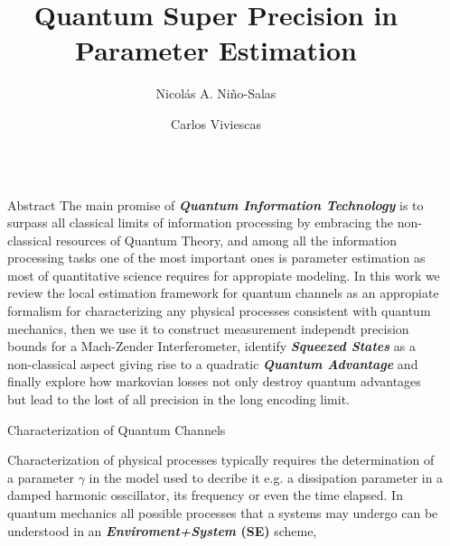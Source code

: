 \documentclass[final]{beamer}
\title{Quantum  Super Precision in Parameter Estimation}
\author{Nicolás A. Niño-Salas \inst{1} \and Carlos Viviescas  \inst{2} }
\institute[shortinst]{Universidad Nacional de Colombia, Sede Bogotá }
\newlength{\sepwidth}
\newlength{\colwidth}
\newcommand{\separatorcolumn}{\begin{column}{\sepwidth}\end{column}}
\begin{document}
\begin{frame}[t]
\begin{columns}[t]
\separatorcolumn

\begin{column}{\colwidth}

  \begin{block}{Abstract}
    The main promise of \textit{\textbf{Quantum Information Technology}} is to surpass all classical limits of information
    processing by embracing the non-classical resources of Quantum
    Theory, and among all the information processing tasks one of the
    most important ones is parameter estimation as most of
    quantitative science requires for appropiate modeling. In this
    work we review the local estimation framework for quantum
    channels  as an appropiate formalism
    for characterizing any physical processes consistent with
    quantum mechanics, then we use it to construct measurement
    independt precision bounds for a Mach-Zender Interferometer,
    identify \textit{\textbf{Squeezed States}} as a non-classical
    aspect giving rise to a quadratic \textit{\textbf{Quantum Advantage}} and finally explore how markovian losses not only
    destroy quantum advantages but lead to the lost of all precision
    in the long encoding limit.
  \end{block}

  \begin{block}{Characterization of Quantum Channels}
  \end{block}
  Characterization of physical processes typically requires the determination of a parameter $\gamma$ in the model used to decribe it e.g.
  a dissipation parameter in a damped harmonic osscillator, its frequency or even the time elapsed. In quantum mechanics
  all possible processes that a systems may undergo can be understood in an \textbf{\textit{Enviroment+System} (SE)} scheme,
\vspace{-0.025\linewidth}


\end{column}
\end{columns}
\end{frame}
\end{document}
